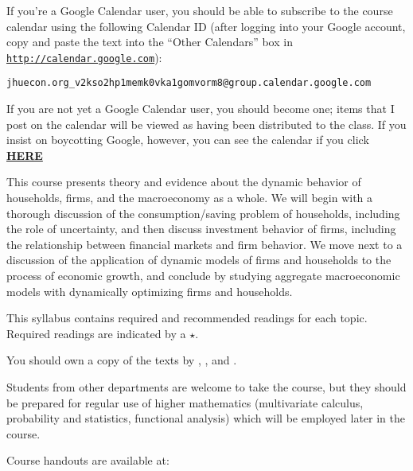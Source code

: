 \documentclass{\econtex}\newcommand{\texname}{Syllabus}
\begin{document}
\begin{small}

If you're a Google Calendar user, you should be able to subscribe to the course calendar using the following Calendar ID (after logging into your Google account, copy and paste the text into the ``Other Calendars'' box in \href{http://calendar.google.com}{\texttt{http://calendar.google.com}}):

\medskip
\centerline{\texttt{jhuecon.org\_v2kso2hp1memk0vka1gomvorm8@group.calendar.google.com}}
\medskip

If you are not yet a Google Calendar user, you should become one; items that I post on the calendar will be viewed as having been distributed to the class.  If you insist on boycotting Google, however, you can see the calendar if you click \href{https://www.google.com/calendar/embed?src=jhuecon.org_v2kso2hp1memk0vka1gomvorm8\%40group.calendar.google.com\&ctz=America/New_York}{\bf HERE}

\medskip

\end{small}
\normalsize

\medskip\medskip

This course presents theory and evidence about the dynamic behavior of
households, firms, and the macroeconomy as a whole.  We will begin
with a thorough discussion of the consumption/saving problem of
households, including the role of uncertainty, and then discuss
investment behavior of firms, including the relationship between
financial markets and firm behavior.  We move next to a discussion of
the application of dynamic models of firms and households to the
process of economic growth, and conclude by studying aggregate
macroeconomic models with dynamically optimizing firms and households.

This syllabus contains required and recommended readings for each
topic.  Required readings are indicated by a $\star$. 

You should own a copy of the texts by \cite{blanchard&fischer:text}, \cite{deatonUnderstandingC}, 
\cite{romer:text} and \cite{lsRecurse}.

{\small Students from other departments are welcome to take the course, but 
they should be prepared for regular use of higher mathematics (multivariate
calculus, probability and statistics, functional analysis) which will be employed
later in the course.}

\medskip\medskip
\noindent Course handouts are available at: 
\medskip
\end{document}
